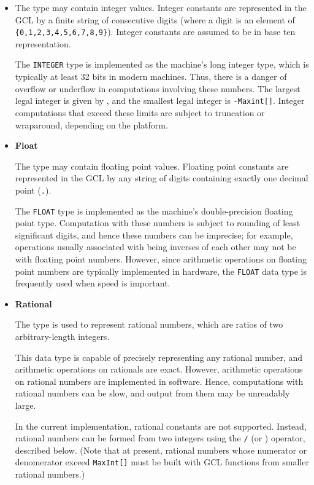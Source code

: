 \begin{itemize}
\item {}

The  type may contain integer values.  Integer constants
are represented in the GCL by a finite string of consecutive digits
(where a digit is an element of \verb+{0,1,2,3,4,5,6,7,8,9}+). Integer
constants are assumed to be in base ten representation.  

The \verb+INTEGER+ type is implemented as the machine's long integer
type, which is typically at least 32 bits in modern machines.  Thus,
there is a danger of overflow or underflow in computations involving
these numbers.  The largest legal integer is given by
, and the smallest legal integer is
\verb+-Maxint[]+.  Integer computations that exceed these limits are
subject to truncation or wraparound, depending on the platform.

\item {\bf Float}

The  type may contain floating point values.  Floating
point constants are represented in the GCL by any string of digits
containing exactly one decimal point (\verb+.+).

The \verb+FLOAT+ type is implemented as the machine's double-precision
floating point type.  Computation with these numbers is subject to
rounding of least significant digits, and hence these numbers can be
imprecise; for example, operations usually associated with being
inverses of each other may not be with floating point
numbers. However, since arithmetic operations on floating point
numbers are typically implemented in hardware, the \verb+FLOAT+ data
type is frequently used when speed is important.

\item {\bf Rational}

The  type is used to represent rational numbers, which
are ratios of two arbitrary-length integers.   

This data type is capable of precisely representing any rational
number, and arithmetic operations on rationals are exact.  However,
arithmetic operations on rational numbers are implemented in software.
Hence, computations with rational numbers can be slow, and output from
them may be unreadably large.

In the current implementation, rational constants are not supported.
Instead, rational numbers can be formed from two integers using the
{\tt /} (or ) operator, described below.  (Note that at
present, rational numbers whose numerator or denomerator exceed
\verb+MaxInt[]+ must be built with GCL functions from smaller rational
numbers.)
\end{itemize}

